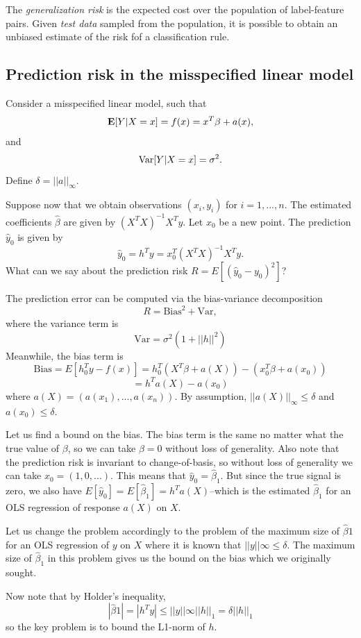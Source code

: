 \documentclass[12pt]{article}
\begin{document}
The \emph{generalization risk} is the expected cost over the
population of label-feature pairs.  Given \emph{test data} sampled
from the population, it is possible to obtain an unbiased estimate of
the risk fof a classification rule.


\subsection{Prediction risk in the misspecified linear model}\label{sec:misspecifiedOLS}

Consider a misspecified linear model, such that
$$\textbf{E}[Y|X=x] = f(x)= x^T \beta + a(x),$$
and
$$\text{Var}[Y|X=x] = \sigma^2.$$
Define $\delta = ||a||_\infty$.

Suppose now that we obtain observations $(x_i, y_i)$ for $i =
1,...,n$.  The estimated coefficients $\hat{\beta}$ are given by $(X^T
X)^{-1} X^T y$. Let $x_0$ be a new point. The prediction $\hat{y}_0$
is given by $$ \hat{y}_0 = h^T y = x_0^T (X^T X)^{-1}X^T y. $$ What
can we say about the prediction risk $R = E[(\hat{y}_0 - y_0)^2]$?

The prediction error can be computed via the bias-variance
decomposition $$ R = \text{Bias}^2 + \text{Var}, $$ where the variance
term is $$ \text{Var} = \sigma^2(1 + ||h||^2) $$ Meanwhile, the bias
term is $$ \text{Bias} = E[h_0^T y - f(x)] = h_0^T (X^T \beta + a(X))
- (x_0^T \beta + a(x_0)) $$ $$ = h^T a(X) - a(x_0) $$ where $a(X) =
(a(x_1),...,a(x_n))$. By assumption, $||a(X)||_\infty \leq \delta$ and
$a(x_0) \leq \delta.$

Let us find a bound on the bias. The bias term is the same no matter
what the true value of $\beta$, so we can take $\beta = 0$ without
loss of generality. Also note that the prediction risk is invariant to
change-of-basis, so without loss of generality we can take $x_0 =
(1,0,...)$. This means that $\hat{y}_0 = \hat{\beta}_1$. But since the
true signal is zero, we also have $E[\hat{y}_0] = E[\hat{\beta}_1] =
h^T a(X)$--which is the estimated $\hat{\beta}_1$ for an OLS
regression of response $a(X)$ on $X$.

Let us change the problem accordingly to the problem of the maximum
size of $\hat{\beta}1$ for an OLS regression of $y$ on $X$ where it is
known that $||y||\infty \leq \delta$. The maximum size of
$\hat{\beta}_1$ in this problem gives us the bound on the bias which
we originally sought.

Now note that by Holder's inequality, 
$$|\hat{\beta}1| = |h^T y| \leq ||y||\infty ||h||_1 = \delta ||h||_1 $$
so the key problem is to bound the L1-norm of $h$.
\end{document}
